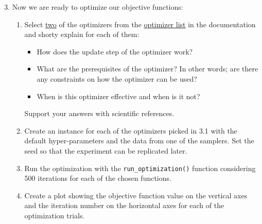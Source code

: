 \documentclass[10pt,a4paper,twoside]{article} %
\def\code#1{\texttt{#1}}
\begin{document}
\begin{enumerate}
	\setcounter{enumi}{2}
	\item Now we are ready to optimize our objective functions:
	\begin{enumerate} [label*=\arabic*.]
		\item Select \underline{two} of the optimizers from the \href{https://bessagroup.github.io/F3DASM/capabilities/algorithms.html\#implemented-optimizers}{optimizer list} in the documentation and shorty explain for each of them:
		
		\begin{itemize}
			\item How does the update step of the optimizer work?
			\item What are the prerequisites of the optimizer? In other words; are there any constraints on how the optimizer can be used?
			\item When is this optimizer effective and when is it not?
		\end{itemize}
	
		Support your answers with scientific references.
		
		\item Create an instance for each of the optimizers picked in 3.1 with the default hyper-parameters and the data from one of the samplers. Set the seed so that the experiment can be replicated later.
		
		\item Run the optimization with the \code{run\_optimization()} function considering 500 iterations for each of the chosen functions. 
		
		\item Create a plot showing the objective function value on the vertical axes and the iteration number on the horizontal axes for each of the optimization trials.
		

		
	\end{enumerate}
\end{enumerate}
\end{document}
